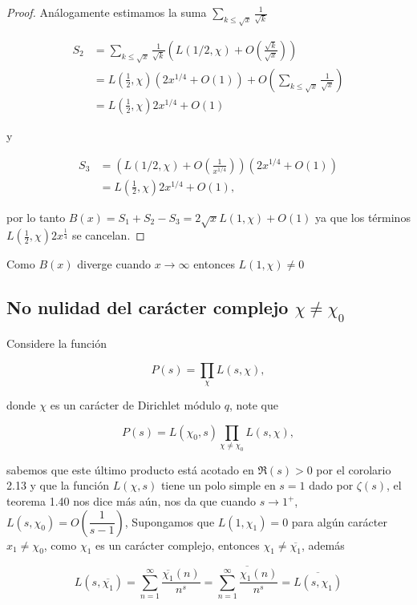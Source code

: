 \begin{proof}
Análogamente estimamos la suma $\displaystyle \sum_{k\leq \sqrt{x}} \frac{1}{\sqrt{k} }$

$$
\begin{aligned}
S_2 & =\sum_{k \leq \sqrt{x}} \frac{1}{\sqrt{k}}\left(L(1 / 2, \chi)+O\left(\frac{\sqrt{k} }{\sqrt{x}}\right)\right) \\
& =L\left(\frac{1}{2}, \chi\right)\left(2 x^{1 / 4}+O(1)\right)+O\left(\sum_{k \leq \sqrt{x}} \frac{1}{\sqrt{x}}\right) \\
& =L\left(\frac{1}{2}, \chi\right) 2 x^{1 / 4}+O(1)
\end{aligned}
$$

y


\begin{align*}
    S_3 & =\left(L(1 / 2, \chi)+O\left(\frac{1}{x^{1 / 4}}\right)\right)\left(2 x^{1 / 4}+O(1)\right) \\
& =L\left(\frac{1}{2}, \chi\right) 2 x^{1 / 4}+O(1),
\end{align*}

por lo tanto $B(x)=S_1+S_2-S_3=2 \sqrt{x}L(1,\chi)+O(1)$ ya que los términos $L(\frac{1}{2},\chi)2x^{\frac{1}{4}}$ se cancelan.

\end{proof}

Como $B(x)$ diverge cuando $x\to\infty$ entonces $L(1,\chi)\neq0$

\subsection{No nulidad del carácter complejo \texorpdfstring{$\chi\neq\chi_0$}{Lg}}

Considere la función

$$P(s)=\prod_{\chi}L(s,\chi),$$

donde $\chi$ es un carácter de Dirichlet módulo $q$, note que 

$$P(s)=L(\chi_0,s)\prod_{\chi\neq \chi_0}L(s,\chi),$$

sabemos que este último producto está acotado en $\Re(s)>0$ por el corolario 2.13 y que la función $L(\chi, s)$ tiene un polo simple en $s=1$ dado por $\zeta(s)$, el teorema 1.40 nos dice más aún, nos da que cuando $s\to 1^{+}$, $L(s,\chi_0)=O\left(\dfrac{1}{s-1}\right)$, Supongamos que $L(1,\chi_1)=0$ para algún carácter $x_1\neq\chi_0$, como $\chi_1$ es un carácter complejo, entonces $\chi_1\neq \overline{\chi_1}$, además

$$L(s,\overline{\chi_1})=\sum_{n=1}^{\infty} \frac{\overline{\chi_1}(n)}{n^s}=\overline{\sum_{n=1}^{\infty} \frac{\chi_1(n)}{n^s}}=\overline{L(s,\chi_1)}$$

